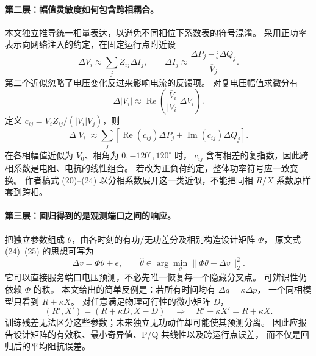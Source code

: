 \paragraph{第二层：幅值灵敏度如何包含跨相耦合。}
本文独立推导统一相量表达，以避免不同相位下系数表的符号混淆。
采用正功率表示向网络注入的约定，在固定运行点附近设
\begin{equation}
 \Delta V_i\approx\sum_j Z_{ij}\Delta I_j,
 \qquad
 \Delta I_j\approx\frac{\Delta P_j-\mathrm j\Delta Q_j}{\overline V_j}.
 \label{eq:eng-s10-di}
\end{equation}
第二个近似忽略了电压变化反过来影响电流的反馈项。
对复电压幅值求微分有
\begin{equation}
 \Delta|V_i|\approx\operatorname{Re}\!\left(
 \frac{\overline V_i}{|V_i|}\Delta V_i\right).
 \label{eq:eng-s10-magnitude}
\end{equation}
定义 $c_{ij}=\overline V_i Z_{ij}/(|V_i|\overline V_j)$，则
\begin{equation}
 \Delta|V_i|\approx\sum_j
 [\operatorname{Re}(c_{ij})\Delta P_j+
   \operatorname{Im}(c_{ij})\Delta Q_j].
 \label{eq:eng-s10-sensitivity}
\end{equation}
在各相幅值近似为 $V_0$、相角为 $0,-120^\circ,120^\circ$ 时，
$c_{ij}$ 含有相差的复指数，因此跨相系数是电阻、电抗的线性组合。
若改为正负荷约定，整体功率符号应一致变换。
作者稿式 (20)--(24) 以分相系数展开这一类近似，不能把同相 $R/X$ 系数原样套到跨相。

\paragraph{第三层：回归得到的是观测端口之间的响应。}
把独立参数组成 $\theta$，由各时刻的有功/无功差分及相别构造设计矩阵 $\Phi$，
原文式 (24)--(25) 的思想可写为
\begin{equation}
 \Delta v=\Phi\theta+e,\qquad
 \widehat\theta\in\arg\min_\theta\|\Phi\theta-\Delta v\|_2^2.
 \label{eq:eng-s10-regression}
\end{equation}
它可以直接服务端口电压预测，不必先唯一恢复每一个隐藏分叉点。
可辨识性仍依赖 $\Phi$ 的秩。
本文给出的简单反例是：若所有时间均有 $\Delta q=\kappa\Delta p$，
一个同相模型只看到 $R+\kappa X$。
对任意满足物理可行性的微小矩阵 $D$，
\begin{equation}
 (R',X')=(R+\kappa D,X-D)
 \quad\Longrightarrow\quad R'+\kappa X'=R+\kappa X.
 \label{eq:eng-s10-confounding}
\end{equation}
训练残差无法区分这些参数；未来独立无功动作却可能使其预测分离。
因此应报告设计矩阵的有效秩、最小奇异值、P/Q 共线性以及跨运行点误差，
而不仅是回归后的平均阻抗误差。

